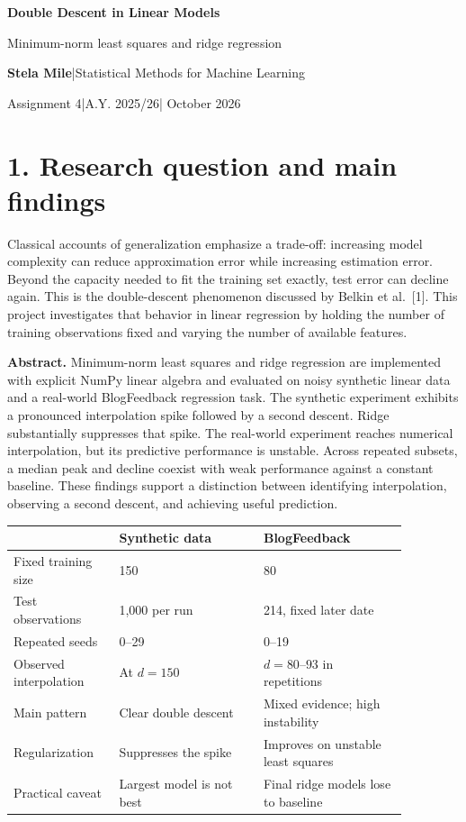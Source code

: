 \documentclass[10pt,a4paper]{article}
\newcommand{\pageheading}[1]{\section*{#1}}
\begin{document}
{\Large\bfseries Double Descent in Linear Models}\par
{\large Minimum-norm least squares and ridge regression}\par
\textbf{Stela Mile}\quad |\quad Statistical Methods for Machine Learning\par
Assignment 4\quad |\quad A.Y. 2025/26\quad | October 2026

\pageheading{1. Research question and main findings}
Classical accounts of generalization emphasize a trade-off: increasing model complexity can reduce approximation error while increasing estimation error. Beyond the capacity needed to fit the training set exactly, test error can decline again. This is the double-descent phenomenon discussed by Belkin et al.\ [1]. This project investigates that behavior in linear regression by holding the number of training observations fixed and varying the number of available features.

\textbf{Abstract.} Minimum-norm least squares and ridge regression are implemented with explicit NumPy linear algebra and evaluated on noisy synthetic linear data and a real-world BlogFeedback regression task. The synthetic experiment exhibits a pronounced interpolation spike followed by a second descent. Ridge substantially suppresses that spike. The real-world experiment reaches numerical interpolation, but its predictive performance is unstable. Across repeated subsets, a median peak and decline coexist with weak performance against a constant baseline. These findings support a distinction between identifying interpolation, observing a second descent, and achieving useful prediction.

\begin{center}
\begin{tabular}{p{0.23\linewidth}p{0.32\linewidth}p{0.32\linewidth}}
\toprule
 & Synthetic data & BlogFeedback \\
\midrule
Fixed training size & 150 & 80 \\
Test observations & 1,000 per run & 214, fixed later date \\
Repeated seeds & 0--29 & 0--19 \\
Observed interpolation & At $d=150$ & $d=80$--$93$ in repetitions \\
Main pattern & Clear double descent & Mixed evidence; high instability \\
Regularization & Suppresses the spike & Improves on unstable least squares \\
Practical caveat & Largest model is not best & Final ridge models lose to baseline \\
\bottomrule
\end{tabular}
\end{center}
\end{document}
